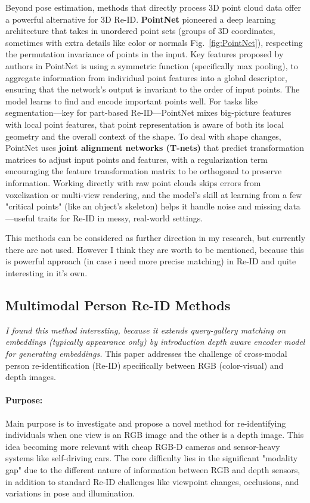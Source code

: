 \documentclass[12pt, a4paper]{article}
\begin{document}
Beyond pose estimation, methods that directly process 3D point cloud data offer a powerful alternative for 3D Re-ID. \textbf{PointNet} \cite{PointNet} pioneered a deep learning architecture that takes in unordered point sets (groups of 3D coordinates, sometimes with extra details like color or normals Fig.~\ref{fig:PointNet}), respecting the permutation invariance of points in the input. Key features proposed by authors in PointNet is using a symmetric function (specifically max pooling), to aggregate information from individual point features into a global descriptor, ensuring that the network's output is invariant to the order of input points.
 The model learns to find and encode important points well. For tasks like segmentation—key for part-based Re-ID—PointNet mixes big-picture features with local point features, that point representation is aware of both its local geometry and the overall context of the shape. To deal with shape changes, PointNet uses \textbf{joint alignment networks (T-nets)} that predict transformation matrices to adjust input points and features, with a regularization term encouraging the feature transformation matrix to be orthogonal to preserve information. Working directly with raw point clouds skips errors from voxelization or multi-view rendering, and the model’s skill at learning from a few "critical points" (like an object’s skeleton) helps it handle noise and missing data—useful traits for Re-ID in messy, real-world settings.

This methods can be considered as further direction in my research, but currently there are not used. However I think they are worth to be mentioned, because this is powerful approach (in case i need more precise matching) in Re-ID \cite{reid_survey} and quite interesting in it's own. 

\subsection{Multimodal Person Re-ID Methods}

\textit{I found this method interesting, because it extends query-gallery matching on embeddings (typically appearance only) by introduction depth aware encoder model for generating embeddings.} This paper \cite{rgb-depth} addresses the challenge of cross-modal person re-identification (Re-ID) specifically between RGB (color-visual) and depth images. 

\paragraph{Purpose:} Main purpose is to investigate and propose a novel method for re-identifying individuals when one view is an RGB image and the other is a depth image. This idea becoming more relevant with cheap RGB-D cameras and sensor-heavy systems like self-driving cars. The core difficulty lies in the significant "modality gap" due to the different nature of information between RGB and depth sensors, in addition to standard Re-ID challenges like viewpoint changes, occlusions, and variations in pose and illumination.
\end{document}
